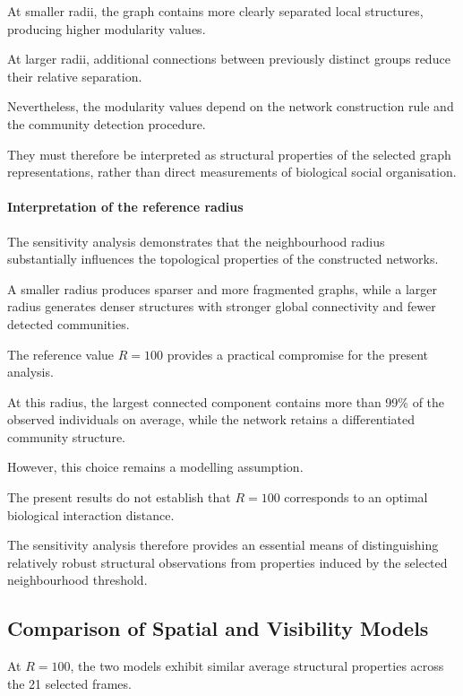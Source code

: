 \documentclass[10pt,a4paper]{article}
\begin{document}
At smaller radii, the graph
contains more clearly separated
local structures, producing
higher modularity values.

At larger radii, additional
connections between previously
distinct groups reduce their
relative separation.

Nevertheless, the modularity
values depend on the network
construction rule and the
community detection procedure.

They must therefore be interpreted
as structural properties of the
selected graph representations,
rather than direct measurements
of biological social organisation.

\paragraph{Interpretation of the reference radius}

The sensitivity analysis demonstrates
that the neighbourhood radius
substantially influences the
topological properties of the
constructed networks.

A smaller radius produces
sparser and more fragmented
graphs, while a larger radius
generates denser structures
with stronger global connectivity
and fewer detected communities.

The reference value $R=100$
provides a practical compromise
for the present analysis.

At this radius, the largest
connected component contains
more than 99\% of the observed
individuals on average, while
the network retains a differentiated
community structure.

However, this choice remains
a modelling assumption.

The present results do not
establish that $R=100$
corresponds to an optimal
biological interaction distance.

The sensitivity analysis
therefore provides an essential
means of distinguishing
relatively robust structural
observations from properties
induced by the selected
neighbourhood threshold.

\FloatBarrier

\subsection{Comparison of Spatial and Visibility Models}

At $R=100$, the two models exhibit
similar average structural properties
across the 21 selected frames.
\end{document}
